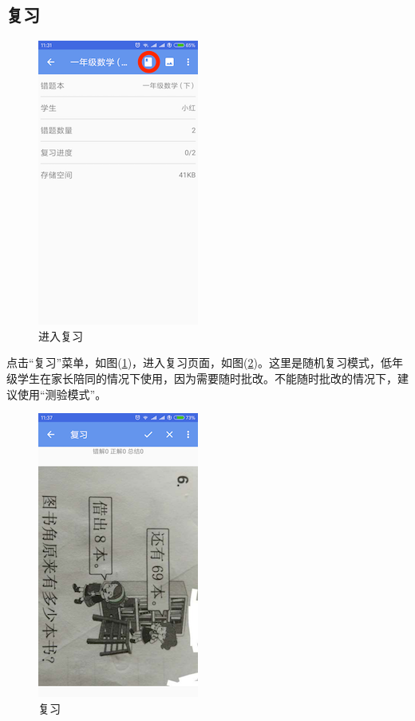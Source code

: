 \subsection{复习}
\begin{figure}[H]
	\centering
	\includegraphics{img/24.png}
	\caption{进入复习}
	\label{img24}
\end{figure}

点击“复习”菜单，如图(\ref{img24})，进入复习页面，如图(\ref{img25})。这里是随机复习模式，低年级学生在家长陪同的情况下使用，因为需要随时批改。不能随时批改的情况下，建议使用“测验模式”。

\begin{figure}[H]
	\centering
	\includegraphics{img/25.png}
	\caption{复习}
	\label{img25}
\end{figure}

